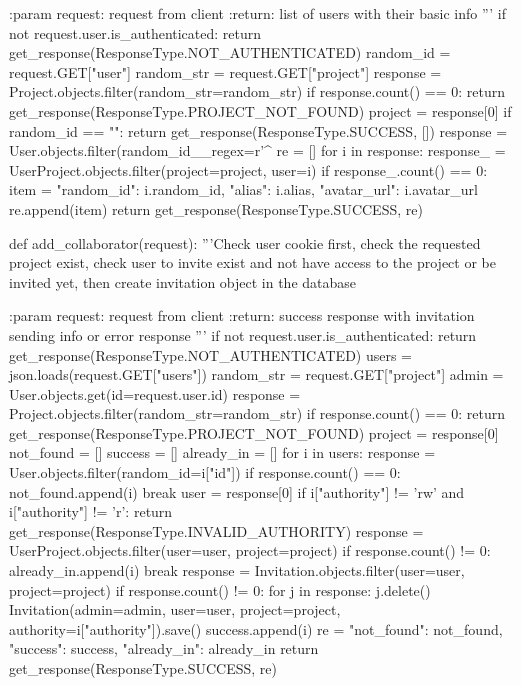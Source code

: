     :param request: request from client
    :return: list of users with their basic info
    '''
    if not request.user.is_authenticated:
        return get_response(ResponseType.NOT_AUTHENTICATED)
    random_id = request.GET["user"]
    random_str = request.GET["project"]
    response = Project.objects.filter(random_str=random_str)
    if response.count() == 0:
        return get_response(ResponseType.PROJECT_NOT_FOUND)
    project = response[0]
    if random_id == "":
        return get_response(ResponseType.SUCCESS, [])
    response = User.objects.filter(random_id__regex=r'^%
    re = []
    for i in response:
        response_ = UserProject.objects.filter(project=project, user=i)
        if response_.count() == 0:
            item = {
                "random_id": i.random_id,
                "alias": i.alias,
                "avatar_url": i.avatar_url
            }
            re.append(item)
    return get_response(ResponseType.SUCCESS, re)


def add_collaborator(request):
    '''Check user cookie first, check the requested project exist,
    check user to invite exist and not have access to the project
    or be invited yet,
    then create invitation object in the database

    :param request: request from client
    :return: success response with invitation sending info or error response
    '''
    if not request.user.is_authenticated:
        return get_response(ResponseType.NOT_AUTHENTICATED)
    users = json.loads(request.GET["users"])
    random_str = request.GET["project"]
    admin = User.objects.get(id=request.user.id)
    response = Project.objects.filter(random_str=random_str)
    if response.count() == 0:
        return get_response(ResponseType.PROJECT_NOT_FOUND)
    project = response[0]
    not_found = []
    success = []
    already_in = []
    for i in users:
        response = User.objects.filter(random_id=i["id"])
        if response.count() == 0:
            not_found.append(i)
            break
        user = response[0]
        if i["authority"] != 'rw' and i["authority"] != 'r':
            return get_response(ResponseType.INVALID_AUTHORITY)
        response = UserProject.objects.filter(user=user, project=project)
        if response.count() != 0:
            already_in.append(i)
            break
        response = Invitation.objects.filter(user=user, project=project)
        if response.count() != 0:
            for j in response:
                j.delete()
        Invitation(admin=admin, user=user, project=project, authority=i["authority"]).save()
        success.append(i)
    re = {
        "not_found": not_found,
        "success": success,
        "already_in": already_in
    }
    return get_response(ResponseType.SUCCESS, re)


